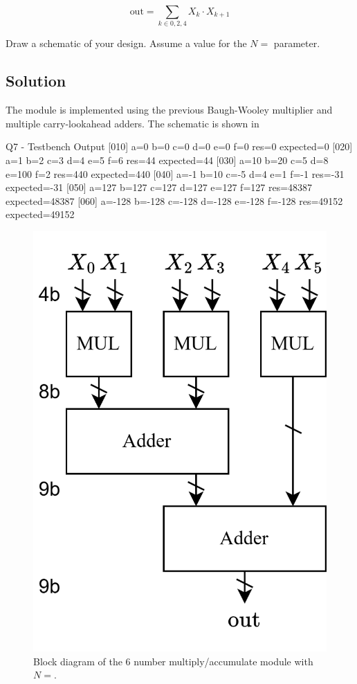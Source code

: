 \documentclass[../main.tex]{subfiles}
\begin{document}
$$
    \text{out} = \sum_{k \in {0, 2, 4}} X_k \cdot X_{k + 1}
$$

Draw a schematic of your design. Assume a value for the $N = $ parameter.

\subsection*{Solution}

The module is implemented using the previous Baugh-Wooley multiplier and multiple carry-lookahead adders. The schematic is shown in

\begin{mintedterminal}{Q7 - Testbench Output}
[010] a=0 b=0 c=0 d=0 e=0 f=0 res=0 expected=0
[020] a=1 b=2 c=3 d=4 e=5 f=6 res=44 expected=44
[030] a=10 b=20 c=5 d=8 e=100 f=2 res=440 expected=440
[040] a=-1 b=10 c=-5 d=4 e=1 f=-1 res=-31 expected=-31
[050] a=127 b=127 c=127 d=127 e=127 f=127 res=48387 expected=48387
[060] a=-128 b=-128 c=-128 d=-128 e=-128 f=-128 res=49152 expected=49152
\end{mintedterminal}

\begin{figure}[h]
    \centering
    \includegraphics[width=0.4\linewidth]{assets/q8.png}
    \caption{Block diagram of the 6 number multiply/accumulate module with $N = $.}
    \label{q8}
\end{figure}
\end{document}
